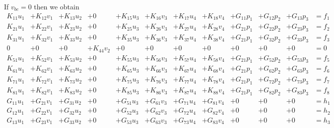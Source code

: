 If $v_{bc}=0$ then we obtain
{\small
\[
\begin{array}{lllllllllllll}
K_{11} u_1 &+ K_{12} v_1 &+ K_{13} u_2 &+ 0 &+ K_{15} u_3 &+ K_{16} v_3 &+ K_{17}u_4  &+ K_{18}v_4  
&+ G_{11}p_1 &+ G_{12} p_2 &+ G_{13} p_3 & =  f_1 \\
K_{21} u_1 &+ K_{22} v_1 &+ K_{23} u_2 &+ 0 &+ K_{25} u_3 &+ K_{26} v_3 &+ K_{27}u_4  &+ K_{28}v_4  
&+ G_{21}p_1 &+ G_{22} p_2 &+ G_{23} p_3 & =  f_2 \\
K_{31} u_1 &+ K_{32} v_1 &+ K_{33} u_2 &+ 0 &+ K_{35} u_3 &+ K_{36} v_3 &+ K_{37}u_4  &+ K_{38}v_4  
&+ G_{21}p_1 &+ G_{32} p_2 &+ G_{33} p_3 & =  f_3 \\
0  &+ 0  &+ 0  &+ K_{44} v_2 &+ 0 &+ 0 &+ 0  &+ 0  
&+ 0 &+ 0 &+ 0 & =  0 \\
K_{51} u_1 &+ K_{52} v_1 &+ K_{53} u_2 &+ 0 &+ K_{55} u_3 &+ K_{56} v_3 &+ K_{57}u_4  &+ K_{58}v_4  
&+ G_{21}p_1 &+ G_{52} p_2 &+ G_{53} p_3 & =  f_5 \\
K_{61} u_1 &+ K_{62} v_1 &+ K_{63} u_2 &+ 0 &+ K_{65} u_3 &+ K_{66} v_3 &+ K_{67}u_4  &+ K_{68}v_4  
&+ G_{21}p_1 &+ G_{62} p_2 &+ G_{63} p_3 & =  f_6 \\
K_{71} u_1 &+ K_{72} v_1 &+ K_{73} u_2 &+ 0 &+ K_{75} u_3 &+ K_{76} v_3 &+ K_{77}u_4  &+ K_{78}v_4  
&+ G_{21}p_1 &+ G_{72} p_2 &+ G_{73} p_3 & =  f_7 \\
K_{81} u_1 &+ K_{82} v_1 &+ K_{83} u_2 &+ 0 &+ K_{85} u_3 &+ K_{86} v_3 &+ K_{87}u_4  &+ K_{88}v_4  
&+ G_{21}p_1 &+ G_{82} p_2 &+ G_{83} p_3 & =  f_8 \\
G_{11}u_1 &+ G_{21}v_1 &+ G_{31}u_2 &+ 0 &+ G_{51}u_3 &+ G_{61}v_3 &+ G_{71}u_4 &+ G_{81}v_4 &+0&+0&+0&= h_1 \\
G_{12}u_1 &+ G_{22}v_1 &+ G_{32}u_2 &+ 0 &+ G_{52}u_3 &+ G_{62}v_3 &+ G_{72}u_4 &+ G_{82}v_4 &+0&+0&+0&= h_2 \\
G_{13}u_1 &+ G_{23}v_1 &+ G_{33}u_2 &+ 0 &+ G_{53}u_3 &+ G_{63}v_3 &+ G_{73}u_4 &+ G_{83}v_4 &+0&+0&+0&= h_3 
\end{array}
\]
}

